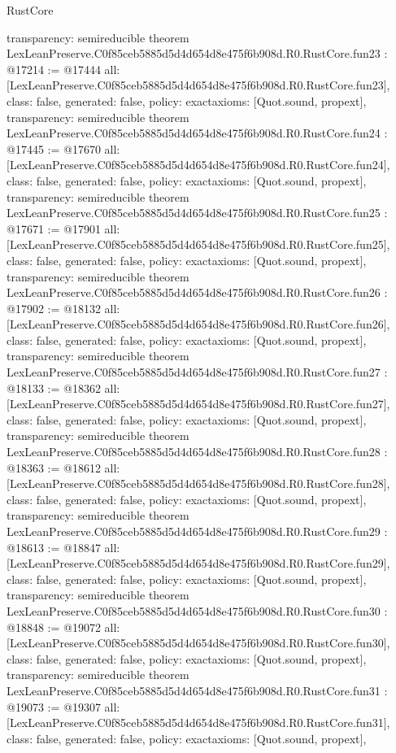 \begin{lexlean}{RustCore}
\begin{coremodule}
{  transparency: semireducible
}
theorem LexLeanPreserve.C0f85ceb5885d5d4d654d8e475f6b908d.R0.RustCore.fun23 : @17214 := @17444 {
  all: [LexLeanPreserve.C0f85ceb5885d5d4d654d8e475f6b908d.R0.RustCore.fun23],
  class: false,
  generated: false,
  policy: exact{axioms: [Quot.sound, propext]},
  transparency: semireducible
}
theorem LexLeanPreserve.C0f85ceb5885d5d4d654d8e475f6b908d.R0.RustCore.fun24 : @17445 := @17670 {
  all: [LexLeanPreserve.C0f85ceb5885d5d4d654d8e475f6b908d.R0.RustCore.fun24],
  class: false,
  generated: false,
  policy: exact{axioms: [Quot.sound, propext]},
  transparency: semireducible
}
theorem LexLeanPreserve.C0f85ceb5885d5d4d654d8e475f6b908d.R0.RustCore.fun25 : @17671 := @17901 {
  all: [LexLeanPreserve.C0f85ceb5885d5d4d654d8e475f6b908d.R0.RustCore.fun25],
  class: false,
  generated: false,
  policy: exact{axioms: [Quot.sound, propext]},
  transparency: semireducible
}
theorem LexLeanPreserve.C0f85ceb5885d5d4d654d8e475f6b908d.R0.RustCore.fun26 : @17902 := @18132 {
  all: [LexLeanPreserve.C0f85ceb5885d5d4d654d8e475f6b908d.R0.RustCore.fun26],
  class: false,
  generated: false,
  policy: exact{axioms: [Quot.sound, propext]},
  transparency: semireducible
}
theorem LexLeanPreserve.C0f85ceb5885d5d4d654d8e475f6b908d.R0.RustCore.fun27 : @18133 := @18362 {
  all: [LexLeanPreserve.C0f85ceb5885d5d4d654d8e475f6b908d.R0.RustCore.fun27],
  class: false,
  generated: false,
  policy: exact{axioms: [Quot.sound, propext]},
  transparency: semireducible
}
theorem LexLeanPreserve.C0f85ceb5885d5d4d654d8e475f6b908d.R0.RustCore.fun28 : @18363 := @18612 {
  all: [LexLeanPreserve.C0f85ceb5885d5d4d654d8e475f6b908d.R0.RustCore.fun28],
  class: false,
  generated: false,
  policy: exact{axioms: [Quot.sound, propext]},
  transparency: semireducible
}
theorem LexLeanPreserve.C0f85ceb5885d5d4d654d8e475f6b908d.R0.RustCore.fun29 : @18613 := @18847 {
  all: [LexLeanPreserve.C0f85ceb5885d5d4d654d8e475f6b908d.R0.RustCore.fun29],
  class: false,
  generated: false,
  policy: exact{axioms: [Quot.sound, propext]},
  transparency: semireducible
}
theorem LexLeanPreserve.C0f85ceb5885d5d4d654d8e475f6b908d.R0.RustCore.fun30 : @18848 := @19072 {
  all: [LexLeanPreserve.C0f85ceb5885d5d4d654d8e475f6b908d.R0.RustCore.fun30],
  class: false,
  generated: false,
  policy: exact{axioms: [Quot.sound, propext]},
  transparency: semireducible
}
theorem LexLeanPreserve.C0f85ceb5885d5d4d654d8e475f6b908d.R0.RustCore.fun31 : @19073 := @19307 {
  all: [LexLeanPreserve.C0f85ceb5885d5d4d654d8e475f6b908d.R0.RustCore.fun31],
  class: false,
  generated: false,
  policy: exact{axioms: [Quot.sound, propext]},
}
\end{coremodule}
\end{lexlean}
